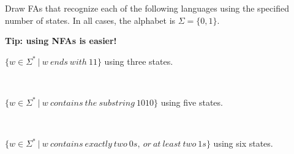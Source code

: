 \documentclass[12pt]{article}
\newenvironment{exercise}[2][Exercise]{\begin{trivlist}
\item[\hskip \labelsep {\bfseries #1}\hskip \labelsep {\bfseries #2.}]}{\end{trivlist}}
\newenvironment{solution}[1][{\color{red} Solution:}]{\begin{trivlist}
\item[\hskip \labelsep {\bfseries #1}\hskip \labelsep {\bfseries}]}{\end{trivlist}}
\begin{document}
 


\newcommand{\studentName}{YOUR NAME HERE} %

\newcommand{\collaborators}{
	with \textit{COLLABORATORS' NAMES HERE}
}


\begin{exercise}{1}
Draw FAs that recognize each of the following languages using the specified number of states.
In all cases, the alphabet is $\Sigma = \{0, 1\}$.

\textbf{Tip: using NFAs is easier!}

\begin{enumerate}[(a)]
	\item $\{ w \in \Sigma^* \ | \ w \ ends \ with \ 11 \}$ using three states.
	\begin{solution}\; \\
	
	\end{solution}
	
	\item $\{ w \in \Sigma^* \ | \ w \ contains \ the \ substring \ 1010  \}$ using five states.
	\begin{solution}\; \\

	\end{solution}
	
	\item$\{ w \in \Sigma^* \ | \ w \ contains \ exactly \ two \ 0s, \ or \ at \ least \ two \ 1s \}$ using six states.
	\begin{solution}
 
	\end{solution}
	
\end{enumerate} \; \\
\end{exercise}
\end{document}
